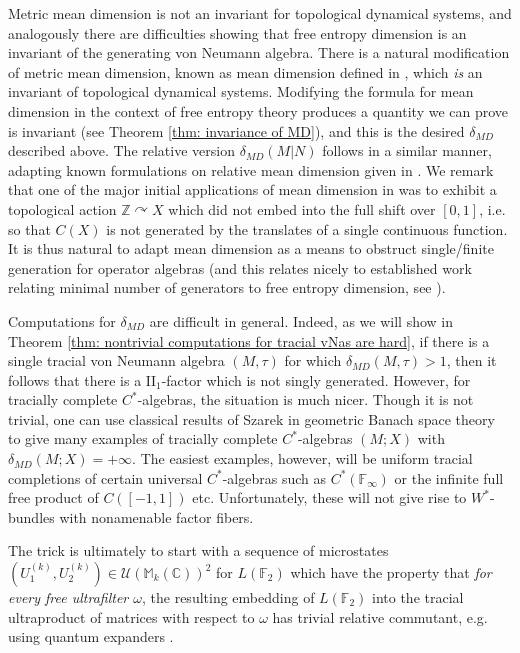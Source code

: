 \documentclass[10pt]{amsart}
\theoremstyle{definition}
\numberwithin{equation}{section}
\newcommand{\bC}{{\mathbb C}}
\newcommand{\bF}{{\mathbb F}}
\newcommand{\bM}{{\mathbb M}}
\newcommand{\bZ}{{\mathbb Z}}
\newcommand{\cU}{{\mathcal U}}
\DeclareMathOperator{\actson}{\curvearrowright}
\begin{document}
Metric mean dimension is not an invariant for topological dynamical systems, and analogously there are difficulties showing that free entropy dimension is an invariant of the generating von Neumann algebra. There is a natural modification of metric mean dimension, known as mean dimension defined in \cite{Li, LindWeiss}, which \emph{is} an invariant of topological dynamical systems. Modifying the formula for mean dimension in the context of free entropy theory produces a quantity we can prove is invariant (see Theorem \ref{thm: invariance of MD}), and this is the desired $\delta_{MD}$ described above. The relative version $\delta_{MD}(M|N)$ follows in a similar manner, adapting known formulations on relative mean dimension given in \cite{li2025soficconditionalmeandimension, liang2021conditionalmeandimension,  TsukaHur}. We remark that one of the major initial applications of mean dimension in \cite{LindWeiss} was to exhibit a topological action  $\bZ\actson X$ which did not embed into the full shift over $[0,1]$, i.e. so that $C(X)$ is not generated by the translates of a single continuous function. It is thus natural to adapt mean dimension as a means to obstruct single/finite generation for operator algebras (and this relates nicely to established work relating minimal number of generators to free entropy dimension, see \cite{DSSW}). 

Computations for $\delta_{MD}$ are difficult in general. Indeed, as we will show in Theorem \ref{thm: nontrivial computations for tracial vNas are hard}, if there is a single tracial von Neumann algebra $(M,\tau)$ for which $\delta_{MD}(M,\tau)>1$, then it follows that there is a $\textrm{II}_{1}$-factor which is not singly generated. However, for tracially complete $C^{*}$-algebras, the situation is much nicer. 
Though it is not trivial, one can use classical results of Szarek \cite{SzarekAlmostEuc, STALmostEuc} in geometric Banach space theory to give many examples of tracially complete $C^{*}$-algebras $(M;X)$ with $\delta_{MD}(M;X)=+\infty$. 
The easiest examples, however, will be uniform tracial completions of certain universal $C^{*}$-algebras such as $C^{*}(\bF_{\infty})$ or the infinite full free product of $C([-1,1])$ etc. Unfortunately, these will not give rise to $W^{*}$-bundles with nonamenable factor fibers.

The trick is ultimately to start with a sequence of microstates $(U^{(k)}_{1},U^{(k)}_{2})\in \cU(\bM_{k}(\bC))^{2}$ for $L(\bF_{2})$ which have the property that \emph{ for every free ultrafilter $\omega$}, the resulting embedding of $L(\bF_{2})$ into the tracial ultraproduct of matrices with respect to $\omega$ has trivial relative commutant, e.g. using quantum expanders \cite{bordenave2023norm, Hastings,PisierQuantumExpander}.
\end{document}
